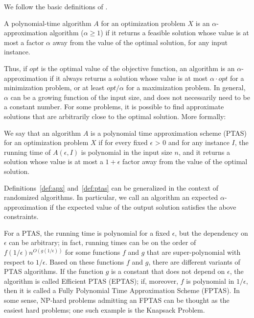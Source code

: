 We follow the basic definitions of \cite{vazirani2013approximation}.

\begin{definition}
 A polynomial-time algorithm $A$ for an optimization problem $X$
is an $\alpha$-approximation algorithm ($\alpha \ge 1$) if it returns a feasible solution whose value is
at most a factor $\alpha$ away from the value of the optimal solution, for any input
instance.
\label{def:apx}
\end{definition}

Thus, if $opt$ is the optimal value of the objective function, an algorithm is an $\alpha$-approximation if it always returns a
solution whose value is at most $\alpha \cdot opt$ for a minimization problem, or at least
$opt/\alpha$ for a maximization problem.
In general, $\alpha$ can be a growing function of the input size, and does not necessarily need to be a constant number.
For some problems, it is possible to find approximate solutions that are
arbitrarily close to the optimal solution. More formally:

\begin{definition}
 We say that an algorithm $A$ is a polynomial time approximation
scheme (PTAS) for an optimization problem $X$ if for every fixed $\epsilon$ > 0 and for
any instance $I$, the running time of $A(\epsilon, I)$ is polynomial in the input size $n$,
and it returns a solution whose value is at most a $1 + \epsilon$ factor away from the
value of the optimal solution.
\label{def:ptas}
\end{definition}


Definitions~\ref{def:apx} and~\ref{def:ptas} can be generalized in the context of randomized algorithms.
In particular, we call an algorithm an expected
$\alpha$-approximation if the expected value of the output solution satisfies the above
constraints.

For a PTAS, the running time is polynomial for a fixed $\epsilon$, but the dependency
on $\epsilon$ can be arbitrary; in fact, running times can be on the order of $f(1/\epsilon)n ^{O(g(1/\epsilon))}$ for some functions $f$ and $g$ that are super-polynomial with
respect to $1/\epsilon$. Based on these functions $f$ and $g$, there are different variants of PTAS algorithms.
If the function $g$ is a constant that does not depend
on $\epsilon$, the algorithm is called Efficient PTAS (EPTAS); if, moreover, $f$
is polynomial in $1/\epsilon$, then it is called a Fully Polynomial Time Approximation
Scheme (FPTAS). In some sense, NP-hard problems admitting an FPTAS can
be thought as the easiest hard problems; one such example is the Knapsack
Problem.

